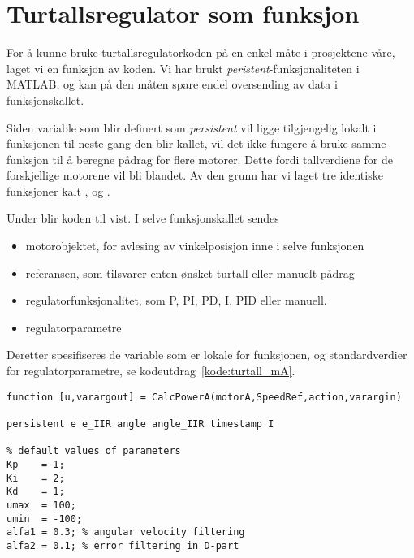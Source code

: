\section{Turtallsregulator som funksjon}\label{kap:funksjon}
For å kunne bruke turtallsregulatorkoden på en enkel måte i
prosjektene våre, laget vi en funksjon av koden. Vi har brukt
{\it  peristent}-funksjonaliteten i MATLAB, og kan på den måten spare
endel oversending av data i funksjonskallet.

Siden variable som blir definert som {\it persistent} vil ligge
tilgjengelig lokalt i funksjonen til neste gang den blir kallet, vil
det ikke fungere å bruke samme funksjon til å beregne pådrag for flere
motorer. Dette fordi tallverdiene for de forskjellige motorene vil bli
blandet. Av den grunn har vi laget tre identiske funksjoner kalt
,  
og .

Under blir koden til  vist.
I selve funksjonskallet sendes
\begin{itemize}
\item motorobjektet, for avlesing av vinkelposisjon inne i selve
  funksjonen
\item referansen, som tilsvarer enten ønsket turtall eller manuelt pådrag 
\item regulatorfunksjonalitet, som P, PI, PD, I, PID eller manuell.
\item regulatorparametre
\end{itemize}

Deretter spesifiseres de variable som er lokale for funksjonen, og
standardverdier for regulatorparametre, se kodeutdrag~\ref{kode:turtall_mA}.

\begin{lstlisting}[caption=Kode fra funksjonen for turtallsregulering av motor A.,
  label=kode:turtall_mA, firstnumber=18]
function [u,varargout] = CalcPowerA(motorA,SpeedRef,action,varargin)

persistent e e_IIR angle angle_IIR timestamp I 

% default values of parameters
Kp    = 1;
Ki    = 2;
Kd    = 1;
umax  = 100;
umin  = -100;
alfa1 = 0.3; % angular velocity filtering
alfa2 = 0.1; % error filtering in D-part
\end{lstlisting}

